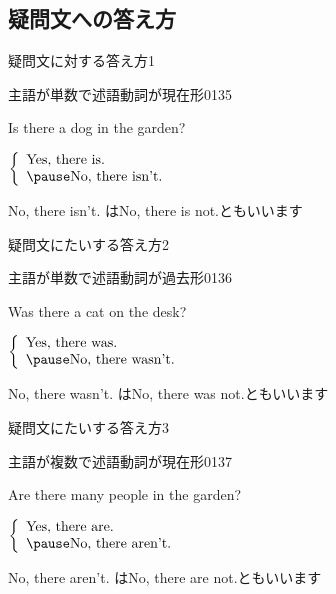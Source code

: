 \documentclass[aspectratio=169,xcolor={dvipsnames,table}]{beamer}
\newcommand{\myaudio}[1]{\href{#1}{\faVolumeUp}}
\begin{document}
\subsection{疑問文への答え方}
 \begin{frame}[plain]{疑問文に対する答え方1}
 \Large

{\normalsize 主語が単数で述語動詞が現在形}\hfill{\tiny 0135}\,{\scriptsize \myaudio{./audio/001_there_is_09.mp3}}
\vspace{10pt}

\pause

Is there a dog in the garden?

\pause

$\left\{\begin{array}{l}
	 \text{Yes, there is.}\\\pause
         \text{No, there isn't.}
	\end{array}\right.$

\pause

\mbox{}\hfill{}{\small No, there isn't. はNo, there is not.ともいいます}
\end{frame}
 \begin{frame}[plain]{疑問文にたいする答え方2}
 \Large

{\normalsize 主語が単数で述語動詞が過去形}\hfill{\tiny 0136}\,{\scriptsize \myaudio{./audio/001_there_is_10.mp3}}
\vspace{10pt}

\pause
Was there a cat on the desk?

\pause

$\left\{\begin{array}{l}
	 \text{Yes, there was.}\\\pause
         \text{No, there wasn't.}
	\end{array}\right.$

\pause

\mbox{}\hfill{}{\small No, there wasn't. はNo, there was not.ともいいます}
\end{frame}
 \begin{frame}[plain]{疑問文にたいする答え方3}
 \Large

{\normalsize 主語が複数で述語動詞が現在形}\hfill{\tiny 0137}\,{\scriptsize \myaudio{./audio/001_there_is_11.mp3}}
\vspace{10pt}

\pause

Are there many people in the garden?

\pause 

$\left\{\begin{array}{l}
	 \text{Yes, there are.}\\\pause
         \text{No, there aren't.}
	\end{array}\right.$

\pause

\mbox{}\hfill{}{\small No, there aren't. はNo, there are not.ともいいます}
\end{frame}
\end{document}
